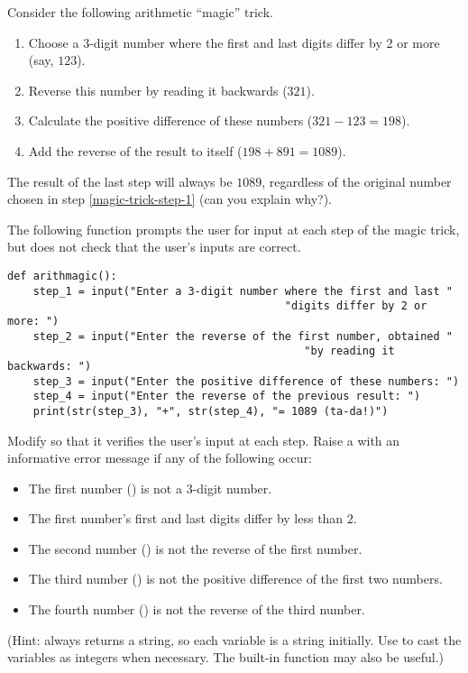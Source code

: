 \begin{problem} %
Consider the following arithmetic ``magic'' trick.
\begin{enumerate}
    \item Choose a 3-digit number where the first and last digits differ by 2 or more (say, $123$).
    \label{magic-trick-step-1}
    \item Reverse this number by reading it backwards ($321$).
    \item Calculate the positive difference of these numbers ($321 - 123 = 198$).
    \item Add the reverse of the result to itself ($198 + 891 = 1089$).
\end{enumerate}
The result of the last step will always be $1089$, regardless of the original number chosen in step \ref{magic-trick-step-1} (can you explain why?).

The following function prompts the user for input at each step of the magic trick, but does not check that the user's inputs are correct.

\begin{lstlisting}
def arithmagic():
    step_1 = input("Enter a 3-digit number where the first and last "
                                           "digits differ by 2 or more: ")
    step_2 = input("Enter the reverse of the first number, obtained "
                                              "by reading it backwards: ")
    step_3 = input("Enter the positive difference of these numbers: ")
    step_4 = input("Enter the reverse of the previous result: ")
    print(str(step_3), "+", str(step_4), "= 1089 (ta-da!)")
\end{lstlisting}

Modify  so that it verifies the user's input at each step.
Raise a  with an informative error message if any of the following occur:
\begin{itemize}
\item The first number () is not a 3-digit number.
\item The first number's first and last digits differ by less than $2$.
\item The second number () is not the reverse of the first number.
\item The third number () is not the positive difference of the first two numbers.
\item The fourth number () is not the reverse of the third number.
\end{itemize}
(Hint:  always returns a string, so each variable is a string initially.
Use  to cast the variables as integers when necessary.
The built-in function  may also be useful.)
\end{problem}

